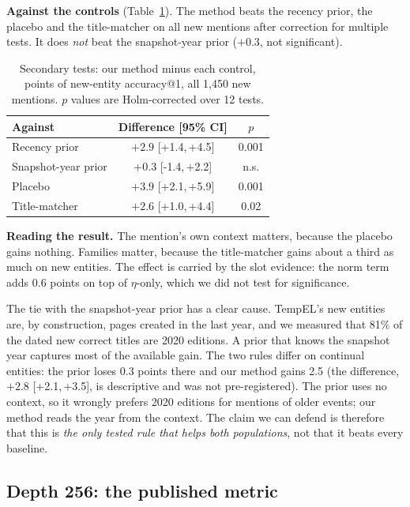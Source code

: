\documentclass[conference]{IEEEtran}
\newcommand{\ci}[2]{[#1,\,#2]}
\begin{document}
\textbf{Against the controls} (Table~\ref{tab:sec}).
The method beats the recency prior, the placebo and the title-matcher on all new mentions after
correction for multiple tests. It does \emph{not} beat the snapshot-year prior ($+0.3$, not
significant).

\begin{table}[t]
\caption{Secondary tests: our method minus each control, points of new-entity accuracy@1, all 1,450 new mentions. $p$ values are Holm-corrected over 12 tests.}
\label{tab:sec}
\centering
\begin{tabular}{lcc}
\toprule
Against & Difference [95\% CI] & $p$ \\
\midrule
Recency prior & $+2.9$ \ci{+1.4}{+4.5} & 0.001 \\
Snapshot-year prior & $+0.3$ \ci{-1.4}{+2.2} & n.s. \\
Placebo & $+3.9$ \ci{+2.1}{+5.9} & 0.001 \\
Title-matcher & $+2.6$ \ci{+1.0}{+4.4} & 0.02 \\
\bottomrule
\end{tabular}
\end{table}

\textbf{Reading the result.}
The mention's own context matters, because the placebo gains nothing. Families matter, because the
title-matcher gains about a third as much on new entities. The effect is carried by the slot
evidence: the norm term adds 0.6 points on top of $\eta$-only, which we did not test for significance.

The tie with the snapshot-year prior has a clear cause. TempEL's new entities are, by construction,
pages created in the last year, and we measured that 81\% of the dated new correct titles are 2020
editions. A prior that knows the snapshot year captures most of the available gain. The two rules
differ on continual entities: the prior loses 0.3 points there and our method gains 2.5 (the
difference, $+2.8$ \ci{+2.1}{+3.5}, is descriptive and was not pre-registered). The prior uses no
context, so it wrongly prefers 2020 editions for mentions of older events; our method reads the year
from the context. The claim we can defend is therefore that this is \emph{the only tested rule that
helps both populations}, not that it beats every baseline.

\subsection{Depth 256: the published metric}
\label{sec:d256}
\end{document}
